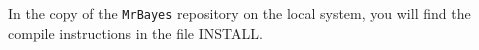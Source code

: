 \documentclass[12pt]{book}
\newcommand{\ttt}[1]{\texttt{#1}}
\begin{document}
In the copy of the \ttt{MrBayes} repository on the local system, you will find the compile
instructions in the file INSTALL.
% 
% 
% 
% 
% 
% 
% 
% 
% 
\end{document}
